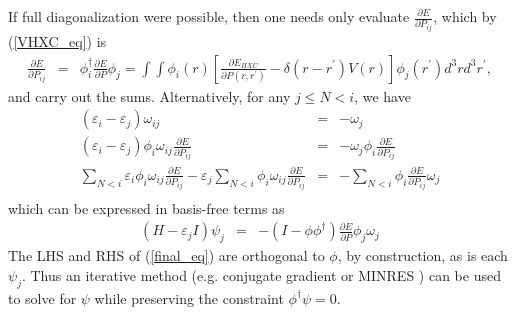 \documentclass[12pt]{iopart}
\newcommand{\beas}{\begin{eqnarray*}}
\newcommand{\enas}{\end{eqnarray*}}
\newcommand{\bea}{\begin{eqnarray}} \newcommand{\ena}{\end{eqnarray}}
\newcommand{\half}{{\frac{1}{2}}} \newcommand{\quarter}{{\frac{1}{4}}}
\newcommand{\Vscp}{V}
\newcommand{\dropthis}[1]{}
\newcommand{\dens}{P}
\begin{document}
If full diagonalization were possible, then one needs only evaluate
$\frac{\partial E}{\partial P_{ij}}$, which by (\ref{VHXC_eq}) is
\beas
\frac{\partial E}{\partial \dens_{ij}}&=& \phi_i^\dagger \frac{\partial E}{\partial \dens}\phi_j
  = \int \int  \phi_i(r) \left[\frac{\partial E_{HXC}}{\partial P(r,r^\prime)} - \delta(r-r^\prime)\Vscp(r)\right] \phi_j(r^\prime) d^3 r d^3 r^\prime,
\enas
and carry out the sums.
Alternatively, for any $j \le N < i$, we have
\beas
 (\varepsilon_i -\varepsilon_j) \omega_{ij}
&=& 
 -\omega_j\\
 (\varepsilon_i -\varepsilon_j) \phi_i \omega_{ij} \frac{\partial E}{\partial P_{ij}}
&=& 
 -\omega_j \phi_i  \frac{\partial E}{\partial P_{ij}}\\
\sum_{N<i} \varepsilon_i \phi_i \omega_{ij} \frac{\partial E}{\partial P_{ij}}
 -\varepsilon_j \sum_{N<i}\phi_i \omega_{ij} \frac{\partial E}{\partial P_{ij}}
&=& 
 -\sum_{N<i} \phi_i  \frac{\partial E}{\partial P_{ij}}\omega_j \\
\enas
which can be expressed in basis-free terms as
\bea
\label{final_eq}
(H -  \varepsilon_j I) \psi_j 
&=& -(I - \phi \phi^\dagger)\frac{\partial E}{\partial P} \phi_j \omega_j
\dropthis{\\
H \psi - \psi \Lambda
&=& -(I - \phi \phi^\dagger) \frac{\partial E}{\partial P} \phi \Omega
}
\ena
The LHS and RHS of (\ref{final_eq}) are orthogonal to $\phi$,
by construction, as is each $\psi_j$.
Thus an iterative method
(e.g. conjugate gradient or MINRES \cite{minres,GolubVanLoan.book:89})
can be used to solve for $\psi$
while preserving the constraint $\phi^\dagger \psi = 0$.

\dropthis{
Otherwise,
we may decompose $\psi = \half \phi \bar{J}+\psi_{\perp}$,
This decomposition is
equivalent to setting
$\left(\frac{\partial E}{\partial H}\right)_0 = \phi \bar{J} \phi^\dagger$
and
$\left(\frac{\partial E}{\partial H}\right)_1 =
 \phi \psi_\perp^\dagger + \psi_\perp \phi^\dagger$
in section \ref{practical_sec}.
We can derive an equation for $\psi_{\perp}$,
by multiplying (\ref{DFT_com_eq})
on the left by the projector
$I - \phi \phi^\dagger$ (which commutes with $H$) and on the
right by $\phi$, {\bf start with diag representation and then go from there.}
\bea
 (I-\phi \phi^\dagger)
 \left[H,\frac{\partial E}{\partial H}\right] \phi 
  &=&
 (I-\phi \phi^\dagger)
 \left[\dens, \frac{\partial E}{\partial \dens}\right]\phi
\\
 (I-\phi \phi^\dagger)
 \left(H \psi - \psi \Lambda\right)
  &=&
 -(I - \phi \phi^\dagger) \frac{\partial E}{\partial \dens} \dens \phi
\\
\label{final_eq}
 H \psi_{\perp} - \psi_{\perp} \Lambda
  &=&
 -(I - \phi \phi^\dagger) \frac{\partial E}{\partial \dens} \phi \Omega.
\ena
The LHS and RHS of (\ref{final_eq}) are orthogonal to $\phi$,
by construction.
Thus we have a well-defined
equation for $\psi_{\perp}$.
An iterative method can thus be used to solve for $\psi_{\perp}$ without any
special initialization beyond $\phi^\dagger \psi_{\perp} = 0$.
}
\end{document}
